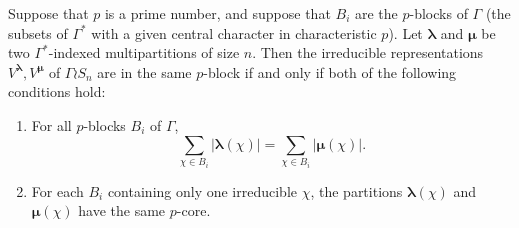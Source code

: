 \documentclass[ALCO,Unicode]{cedram}
\newcommand{\bs}{\boldsymbol}
\begin{document}
\begin{theorem} \label{wreath_nakayama_thm}
Suppose that $p$ is a prime number, and suppose that $B_i$ are the $p$-blocks of $\Gamma$ \textup{(}the subsets of $\Gamma^*$ with a given central character in characteristic $p$\textup{)}. Let $\bs\lambda$ and $\bs \mu$ be two $\Gamma^*$-indexed multipartitions of size $n$. Then the irreducible representations $V^{\bs\lambda}, V^{\bs\mu}$ of $\Gamma \wr S_n$ are in the same $p$-block if and only if both of the following conditions hold:
\begin{enumerate}[label=(\arabic*)]
\item \label{7.9it1} For all $p$-blocks $B_i$ of $\Gamma$,
\[
\sum_{\chi \in B_i} |\bs\lambda(\chi)| = \sum_{\chi \in B_i} |\bs\mu(\chi)|.
\]
\item \label{7.9it2} For each $B_i$ containing only one irreducible $\chi$, the partitions $\bs\lambda(\chi)$ and $\bs\mu(\chi)$ have the same $p$-core.
\end{enumerate}
\end{theorem}
\end{document}
